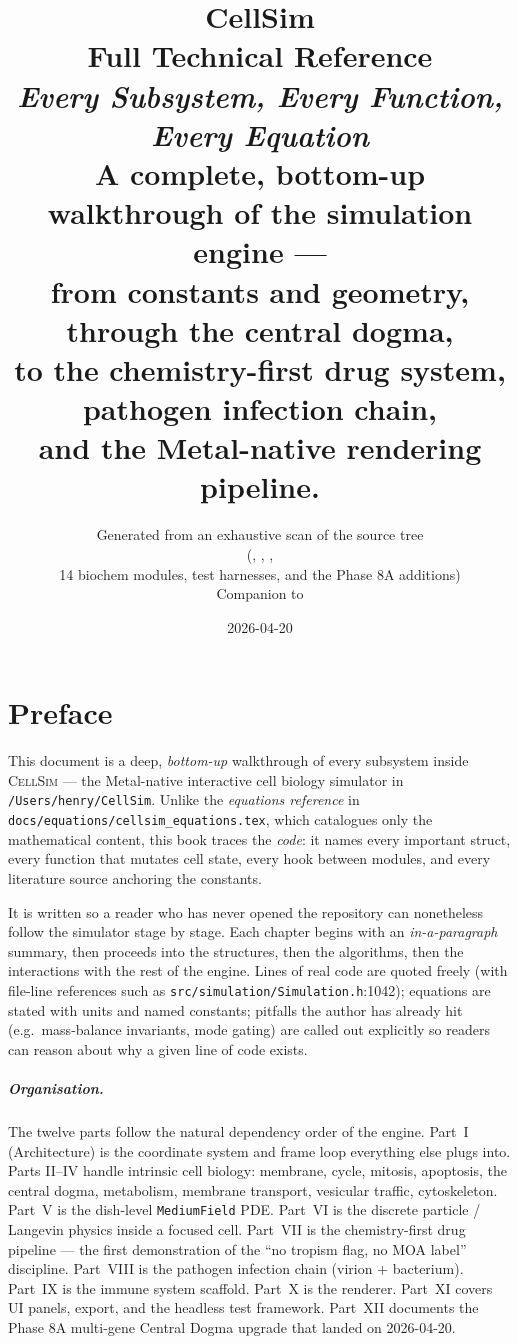 \documentclass[11pt,letterpaper,twoside,openany]{book}
\title{%
  \Huge\textbf{CellSim}\\[0.4em]
  \LARGE Full Technical Reference\\[0.5em]
  \Large \textsl{Every Subsystem, Every Function, Every Equation}\\[1.0em]
  \large A complete, bottom-up walkthrough of the simulation engine ---\\
  from constants and geometry, through the central dogma,\\
  to the chemistry-first drug system, pathogen infection chain,\\
  and the Metal-native rendering pipeline.
}
\author{%
  Generated from an exhaustive scan of the source tree\\
  (\file{src/main.mm}, \file{src/simulation/*}, \file{src/core/Constants.h},\\
  14 biochem modules, test harnesses, and the Phase 8A additions)\\[0.5em]
  Companion to \file{docs/equations/cellsim\_equations.tex}
}
\date{2026-04-20}
\newcommand{\code}[1]{\texttt{#1}}
\newcommand{\file}[1]{\texttt{\small#1}}
\begin{document}
\frontmatter
\maketitle

\chapter*{Preface}

\noindent This document is a deep, \emph{bottom-up} walkthrough of
every subsystem inside \textsc{CellSim} --- the Metal-native interactive
cell biology simulator in \file{/Users/henry/CellSim}. Unlike the
\emph{equations reference} in \file{docs/equations/cellsim\_equations.tex},
which catalogues only the mathematical content, this book traces the
\emph{code}: it names every important struct, every function that
mutates cell state, every hook between modules, and every literature
source anchoring the constants.

It is written so a reader who has never opened the repository can
nonetheless follow the simulator stage by stage. Each chapter begins
with an \emph{in-a-paragraph} summary, then proceeds into the
structures, then the algorithms, then the interactions with the rest
of the engine. Lines of real code are quoted freely (with file-line
references such as \file{src/simulation/Simulation.h}:1042); equations
are stated with units and named constants; pitfalls the author has
already hit (e.g.\ mass-balance invariants, mode gating) are called
out explicitly so readers can reason about why a given line of code
exists.

\paragraph{Organisation.} The twelve parts follow the natural
dependency order of the engine. Part~\textsc{I} (Architecture) is the
coordinate system and frame loop everything else plugs into. Parts
\textsc{II}--\textsc{IV} handle intrinsic cell biology: membrane,
cycle, mitosis, apoptosis, the central dogma, metabolism, membrane
transport, vesicular traffic, cytoskeleton. Part~\textsc{V} is the
dish-level \code{MediumField} PDE. Part~\textsc{VI} is the discrete
particle / Langevin physics inside a focused cell. Part~\textsc{VII}
is the chemistry-first drug pipeline --- the first demonstration of
the ``no tropism flag, no MOA label'' discipline. Part~\textsc{VIII}
is the pathogen infection chain (virion + bacterium). Part~\textsc{IX}
is the immune system scaffold. Part~\textsc{X} is the renderer.
Part~\textsc{XI} covers UI panels, export, and the headless test
framework. Part~\textsc{XII} documents the Phase 8A multi-gene
Central Dogma upgrade that landed on 2026-04-20.
\end{document}
